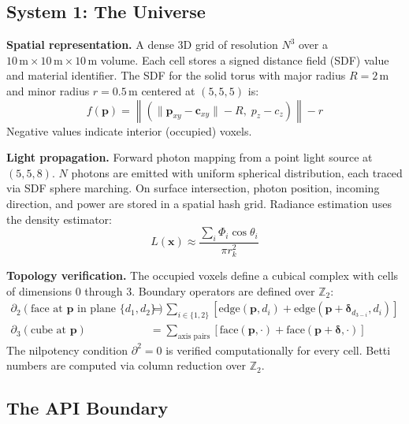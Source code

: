 \documentclass[11pt,a4paper]{article}
\theoremstyle{remark}
\begin{document}
\subsection{System 1: The Universe}

\textbf{Spatial representation.} A dense 3D grid of resolution $N^3$ over a $10\,\text{m} \times 10\,\text{m} \times 10\,\text{m}$ volume. Each cell stores a signed distance field (SDF) value and material identifier. The SDF for the solid torus with major radius $R = 2$\,m and minor radius $r = 0.5$\,m centered at $(5, 5, 5)$ is:
\begin{equation}
    f(\mathbf{p}) = \left\lVert\left(\lVert \mathbf{p}_{xy} - \mathbf{c}_{xy}\rVert - R,\; p_z - c_z\right)\right\rVert - r
    \label{eq:sdf}
\end{equation}
Negative values indicate interior (occupied) voxels.

\textbf{Light propagation.} Forward photon mapping from a point light source at $(5, 5, 8)$. $N$ photons are emitted with uniform spherical distribution, each traced via SDF sphere marching. On surface intersection, photon position, incoming direction, and power are stored in a spatial hash grid. Radiance estimation uses the density estimator:
\begin{equation}
    L(\mathbf{x}) \approx \frac{\sum_i \Phi_i \cos\theta_i}{\pi r_k^2}
    \label{eq:radiance}
\end{equation}

\textbf{Topology verification.} The occupied voxels define a cubical complex with cells of dimensions 0 through 3. Boundary operators are defined over $\mathbb{Z}_2$:
\begin{align}
    \partial_2(\text{face at } \mathbf{p} \text{ in plane } \{d_1, d_2\}) &= \sum_{i \in \{1,2\}} \left[\text{edge}(\mathbf{p}, d_i) + \text{edge}(\mathbf{p} + \boldsymbol{\delta}_{d_{3-i}}, d_i)\right] \label{eq:boundary2}\\
    \partial_3(\text{cube at } \mathbf{p}) &= \sum_{\text{axis pairs}} \left[\text{face}(\mathbf{p}, \cdot) + \text{face}(\mathbf{p} + \boldsymbol{\delta}, \cdot)\right] \label{eq:boundary3}
\end{align}
The nilpotency condition $\partial^2 = 0$ is verified computationally for every cell. Betti numbers are computed via column reduction over $\mathbb{Z}_2$.

\subsection{The API Boundary}
\end{document}
